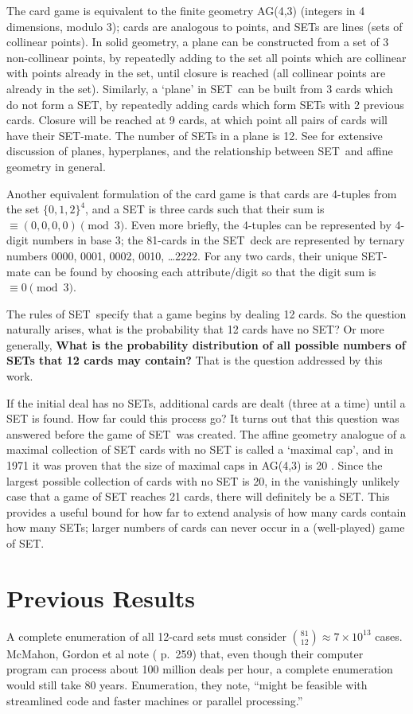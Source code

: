 \documentclass[10pt]{amsart}
\newcommand{\SETb}{SET\texttrademark\ } %
\newcommand{\SET}{SET\texttrademark}  %
\begin{document}
The card game is equivalent to the finite geometry AG(4,3) (integers in 4
dimensions, modulo 3); cards are analogous to points, and SETs are lines (sets
of collinear points). In solid geometry, a plane can be constructed from a set
of 3 non-collinear points, by repeatedly adding to the set all points which are
collinear with points already in the set, until closure is reached (all
collinear points are already in the set). Similarly, a `plane' in \SETb can be
built from 3 cards which do not form a SET, by repeatedly adding cards which
form SETs with 2 previous cards. Closure will be reached at 9 cards, at which
point all pairs of cards will have their SET-mate. The number of SETs in a plane
is 12. See \cite{JOS} for extensive discussion of planes, hyperplanes, and the
relationship between \SETb and affine geometry in general.

Another equivalent formulation of the card game is that cards are 4-tuples from
the set $\{0,1,2\}^4$, and a SET is three cards such that their sum is $\equiv
(0,0,0,0) \pmod{3}$. Even more briefly, the 4-tuples can be represented by
4-digit numbers in base 3; the 81-cards in the \SETb deck are represented by
ternary numbers 0000, 0001, 0002, 0010, \ldots 2222. For any two cards, their
unique SET-mate can be found by choosing each attribute/digit so that the digit
sum is $\equiv 0 \pmod{3}$.

The rules of \SETb specify that a game begins by dealing 12 cards. So the
question naturally arises, what is the probability that 12 cards have no SET? Or
more generally, {\bf What is the probability distribution of all possible
  numbers of SETs that 12 cards may contain?} That is the question addressed by
this work.

If the initial deal has no SETs, additional cards are dealt (three at a time)
until a SET is found. How far could this process go? It turns out that this
question was answered before the game of \SETb was created. The affine geometry
analogue of a maximal collection of SET cards with no SET is called a `maximal
cap', and in 1971 it was proven that the size of maximal caps in AG(4,3) is 20
\cite{MAXCAP}. Since the largest possible collection of cards with no SET is 20,
in the vanishingly unlikely case that a game of SET reaches 21 cards, there will
definitely be a SET.  This provides a useful bound for how far to extend
analysis of how many cards contain how many SETs; larger numbers of cards can
never occur in a (well-played) game of \SET.

\section{Previous Results}
A complete enumeration of all 12-card sets must consider $\binom{81}{12} \approx
7\times 10^{13}$ cases. McMahon, Gordon et al note (\cite{JOS} p.~259) that,
even though their computer program can process about 100 million deals per hour,
a complete enumeration would still take 80 years. Enumeration, they note,
``might be feasible with streamlined code and faster machines or parallel
processing.''
\end{document}
